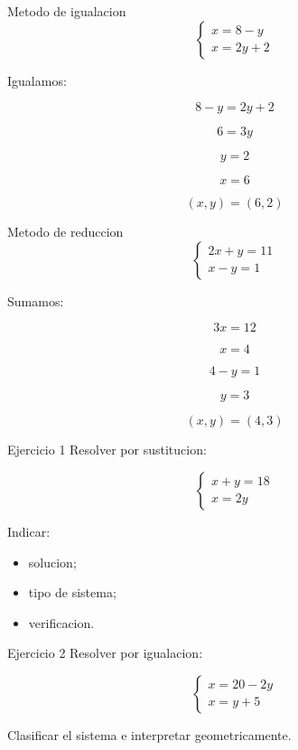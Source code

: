 \documentclass[aspectratio=169]{beamer}
\begin{document}
	\begin{frame}{Metodo de igualacion}
		\[
		\begin{cases}
			x=8-y\\
			x=2y+2
		\end{cases}
		\]
		
		Igualamos:
		
		\[
		8-y=2y+2
		\]
		
		\[
		6=3y
		\]
		
		\[
		y=2
		\]
		
		\[
		x=6
		\]
		
		\[
		\boxed{(x,y)=(6,2)}
		\]
	\end{frame}
	
	\begin{frame}{Metodo de reduccion}
		\[
		\begin{cases}
			2x+y=11\\
			x-y=1
		\end{cases}
		\]
		
		Sumamos:
		
		\[
		3x=12
		\]
		
		\[
		x=4
		\]
		
		\[
		4-y=1
		\]
		
		\[
		y=3
		\]
		
		\[
		\boxed{(x,y)=(4,3)}
		\]
	\end{frame}
	
	\begin{frame}{Ejercicio 1}
		Resolver por sustitucion:
		
		\[
		\begin{cases}
			x+y=18\\
			x=2y
		\end{cases}
		\]
		
		\bigskip
		
		Indicar:
		
		\begin{itemize}
			\item solucion;
			\item tipo de sistema;
			\item verificacion.
		\end{itemize}
	\end{frame}
	
	\begin{frame}{Ejercicio 2}
		Resolver por igualacion:
		
		\[
		\begin{cases}
			x=20-2y\\
			x=y+5
		\end{cases}
		\]
		
		\bigskip
		
		Clasificar el sistema e interpretar geometricamente.
	\end{frame}
	
\end{document}
